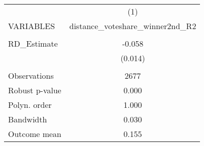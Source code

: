 \documentclass[]{article}
\begin{document}
\begin{tabular}{lc} \hline
 & (1) \\
VARIABLES & distance\_voteshare\_winner2nd\_R2 \\ \hline
 &  \\
RD\_Estimate & -0.058 \\
 & (0.014) \\
 &  \\
Observations & 2677 \\
Robust p-value & 0.000 \\
Polyn. order & 1.000 \\
Bandwidth & 0.030 \\
 Outcome mean & 0.155 \\ \hline
\end{tabular}
\end{document}
